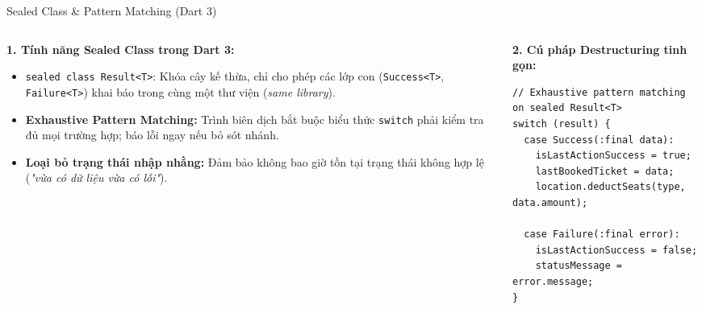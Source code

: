 \documentclass[aspectratio=169, 10pt]{beamer}
\begin{document}
\begin{frame}[fragile]{Sealed Class \& Pattern Matching (Dart 3)}
  \begin{columns}[t,onlytextwidth]
    \begin{column}{0.49\textwidth}
      \textbf{1. Tính năng Sealed Class trong Dart 3:}
      \begin{itemize}
        \item \texttt{sealed class Result<T>}: Khóa cây kế thừa, chỉ cho phép các lớp con (\texttt{Success<T>}, \texttt{Failure<T>}) khai báo trong cùng một thư viện (\textit{same library}).
        \item \textbf{Exhaustive Pattern Matching:} Trình biên dịch bắt buộc biểu thức \texttt{switch} phải kiểm tra đủ mọi trường hợp; báo lỗi ngay nếu bỏ sót nhánh.
        \item \textbf{Loại bỏ trạng thái nhập nhằng:} Đảm bảo không bao giờ tồn tại trạng thái không hợp lệ (\textit{"vừa có dữ liệu vừa có lỗi"}).
      \end{itemize}
    \end{column}

    \begin{column}{0.49\textwidth}
      \textbf{2. Cú pháp Destructuring tinh gọn:}
      \begin{lstlisting}[basicstyle=\ttfamily\scriptsize\color{black}, columns=flexible]
// Exhaustive pattern matching on sealed Result<T>
switch (result) {
  case Success(:final data):
    isLastActionSuccess = true;
    lastBookedTicket = data;
    location.deductSeats(type, data.amount);
    
  case Failure(:final error):
    isLastActionSuccess = false;
    statusMessage = error.message;
}
      \end{lstlisting}
    \end{column}
  \end{columns}
\end{frame}
\end{document}
